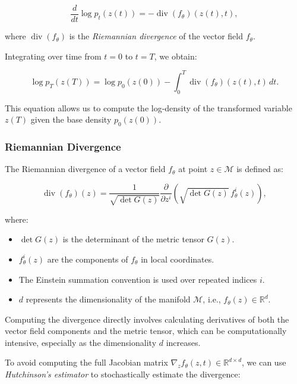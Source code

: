 \documentclass[a4paper,14pt]{article}
\theoremstyle{plain} %
\theoremstyle{definition} %
\theoremstyle{remark} %
\begin{document}
	\begin{equation}
		\frac{d}{dt} \log p_t(z(t)) = -\operatorname{div}(f_\theta)(z(t), t),
	\end{equation}
	
	where \(\operatorname{div}(f_\theta)\) is the \textit{Riemannian divergence} of the vector field \(f_\theta\).
	
	Integrating over time from \(t = 0\) to \(t = T\), we obtain:
	
	\begin{equation}
		\log p_T(z(T)) = \log p_0(z(0)) - \int_0^T \operatorname{div}(f_\theta)(z(t), t) \, dt.
	\end{equation}
	
	This equation allows us to compute the log-density of the transformed variable \(z(T)\) given the base density \(p_0(z(0))\).
	
	\subsubsection{Riemannian Divergence}
	
	The Riemannian divergence of a vector field \(f_\theta\) at point \(z \in \mathcal{M}\) is defined as:
	
	\begin{equation}
		\operatorname{div}(f_\theta)(z) = \frac{1}{\sqrt{\det G(z)}} \frac{\partial}{\partial z^i} \left( \sqrt{\det G(z)} \, f_\theta^i(z) \right),
	\end{equation}
	
	where:
	
	\begin{itemize}
		\item \(\det G(z)\) is the determinant of the metric tensor \(G(z)\).
		\item \(f_\theta^i(z)\) are the components of \(f_\theta\) in local coordinates.
		\item The Einstein summation convention is used over repeated indices \(i\).
		\item \(d\) represents the dimensionality of the manifold \(\mathcal{M}\), i.e., \(f_\theta(z) \in \mathbb{R}^d\).
	\end{itemize}
	
	Computing the divergence directly involves calculating derivatives of both the vector field components and the metric tensor, which can be computationally intensive, especially as the dimensionality \(d\) increases.
	
	To avoid computing the full Jacobian matrix \(\nabla_z f_\theta(z, t) \in \mathbb{R}^{d \times d}\), we can use \textit{Hutchinson's estimator} to stochastically estimate the divergence:
	
\end{document}
